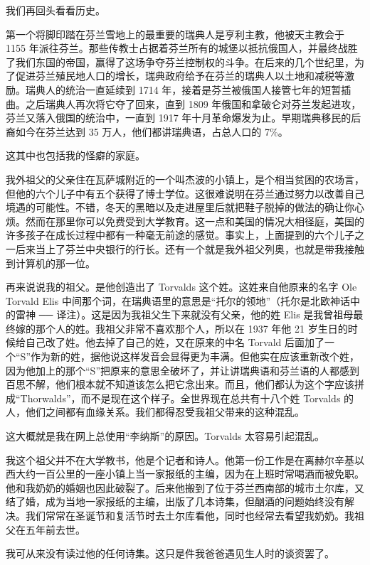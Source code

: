 我们再回头看看历史。

第一个将脚印踏在芬兰雪地上的最重要的瑞典人是亨利主教，他被天主教会于 1155 年派往芬兰。那些传教士占据着芬兰所有的城堡以抵抗俄国人，并最终战胜了我们东国的帝国，赢得了这场争夺芬兰控制权的斗争。在后来的几个世纪里，为了促进芬兰殖民地人口的增长，瑞典政府给予在芬兰的瑞典人以土地和减税等激励。瑞典人的统治一直延续到 1714 年，接着是芬兰被俄国人接管七年的短暂插曲。之后瑞典人再次将它夺了回来，直到 1809 年俄国和拿破仑对芬兰发起进攻，芬兰又落入俄国的统治中，一直到 1917 年十月革命爆发为止。早期瑞典移民的后裔如今在芬兰达到 35 万人，他们都讲瑞典语，占总人口的 7\%。

这其中也包括我的怪癖的家庭。

我外祖父的父亲住在瓦萨城附近的一个叫杰波的小镇上，是个相当贫困的农场言，但他的六个儿子中有五个获得了博士学位。这很难说明在芬兰通过努力以改善自己境遇的可能性。不错，冬天的黑暗以及走进屋里后就把鞋子脱掉的做法的确让你心烦。然而在那里你可以免费受到大学教育。这一点和美国的情况大相径庭，美国的许多孩子在成长过程中都有一种毫无前途的感觉。事实上，上面提到的六个儿子之一后来当上了芬兰中央银行的行长。还有一个就是我外祖父列奥，也就是带我接触到计算机的那一位。

再来说说我的祖父。是他创造出了 Torvalds 这个姓。这姓来自他原来的名字 Ole Torvald Elis 中间那个词，在瑞典语里的意思是“托尔的领地”（托尔是北欧神话中的雷神 ── 译注）。这是因为我祖父生下来就没有父亲，他的姓 Elis 是我曾祖母最终嫁的那个人的姓。我祖父非常不喜欢那个人，所以在 1937 年他 21 岁生日的时候给自己改了姓。他去掉了自己的姓，又在原来的中名 Torvald 后面加了一个“S”作为新的姓，据他说这样发音会显得更为丰满。但他实在应该重新改个姓，因为他加上的那个“S”把原来的意思全破坏了，并让讲瑞典语和芬兰语的人都感到百思不解，他们根本就不知道该怎么把它念出来。而且，他们都认为这个字应该拼成“Thorwalds”，而不是现在这个样子。全世界现在总共有十八个姓 Torvalds 的人，他们之间都有血缘关系。我们都得忍受我祖父带来的这种混乱。

这大概就是我在网上总使用“李纳斯”的原因。Torvalds 太容易引起混乱。

我这个祖父并不在大学教书，他是个记者和诗人。他第一份工作是在离赫尔辛基以西大约一百公里的一座小镇上当一家报纸的主编，因为在上班时常喝酒而被免职。他和我奶奶的婚姻也因此破裂了。后来他搬到了位于芬兰西南部的城市土尔库，又结了婚，成为当地一家报纸的主编，出版了几本诗集，但酗酒的问题始终没有解决。我们常常在圣诞节和复活节时去土尔库看他，同时也经常去看望我奶奶。我祖父在五年前去世。

我可从来没有读过他的任何诗集。这只是件我爸爸遇见生人时的谈资罢了。

